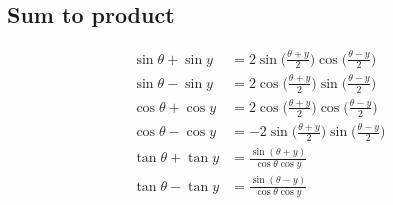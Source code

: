 \subsection*{Sum to product}

\begin{align*}
  \sin \theta + \sin y &= 2 \sin \Big( \frac{\theta + y}{2} \Big) \cos \Big( \frac{\theta - y}{2} \Big)\\
  \sin \theta - \sin y &= 2 \cos \Big( \frac{\theta + y}{2} \Big) \sin \Big( \frac{\theta - y}{2} \Big)\\
  \cos \theta + \cos y &= 2 \cos \Big( \frac{\theta + y}{2} \Big) \cos \Big( \frac{\theta - y}{2} \Big)\\
  \cos \theta - \cos y &= -2 \sin \Big( \frac{\theta + y}{2} \Big) \sin \Big( \frac{\theta - y}{2} \Big)\\
  \tan \theta + \tan y &= \frac{ \sin(\theta + y) }{ \cos \theta \cos y}\\
  \tan \theta - \tan y &= \frac{ \sin(\theta - y) }{ \cos \theta \cos y}\\
\end{align*}